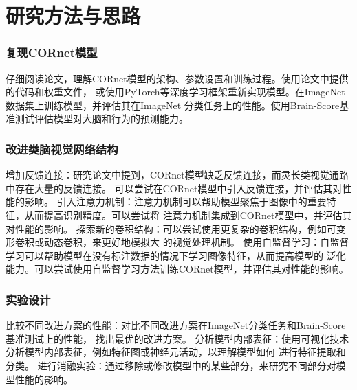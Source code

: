 \section{研究方法与思路}

\subsubsection{复现CORnet模型}
仔细阅读论文，理解CORnet模型的架构、参数设置和训练过程。使用论文中提供的代码和权重文件，
或使用PyTorch等深度学习框架重新实现模型。在ImageNet数据集上训练模型，并评估其在ImageNet
分类任务上的性能。使用Brain-Score基准测试评估模型对大脑和行为的预测能力。
\subsubsection{改进类脑视觉网络结构}
增加反馈连接：研究论文中提到，CORnet模型缺乏反馈连接，而灵长类视觉通路中存在大量的反馈连接。
可以尝试在CORnet模型中引入反馈连接，并评估其对性能的影响。
引入注意力机制：注意力机制可以帮助模型聚焦于图像中的重要特征，从而提高识别精度。可以尝试将
注意力机制集成到CORnet模型中，并评估其对性能的影响。
探索新的卷积结构：可以尝试使用更复杂的卷积结构，例如可变形卷积或动态卷积，来更好地模拟大
的视觉处理机制。
使用自监督学习：自监督学习可以帮助模型在没有标注数据的情况下学习图像特征，从而提高模型的
泛化能力。可以尝试使用自监督学习方法训练CORnet模型，并评估其对性能的影响。
\subsubsection{实验设计}
比较不同改进方案的性能：对比不同改进方案在ImageNet分类任务和Brain-Score基准测试上的性能，
找出最优的改进方案。
分析模型内部表征：使用可视化技术分析模型内部表征，例如特征图或神经元活动，以理解模型如何
进行特征提取和分类。
进行消融实验：通过移除或修改模型中的某些部分，来研究不同部分对模型性能的影响。



